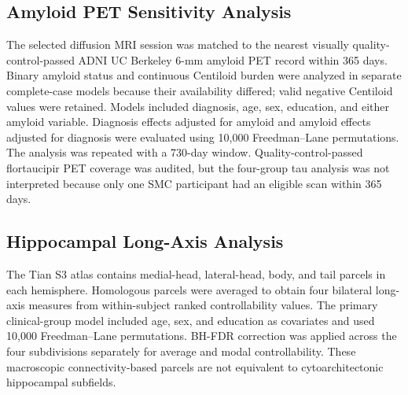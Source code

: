 \documentclass{article}
\begin{document}
\subsection{Amyloid PET Sensitivity Analysis}
The selected diffusion MRI session was matched to the nearest visually quality-control-passed ADNI UC Berkeley 6-mm amyloid PET record within 365 days. Binary amyloid status and continuous Centiloid burden were analyzed in separate complete-case models because their availability differed; valid negative Centiloid values were retained. Models included diagnosis, age, sex, education, and either amyloid variable. Diagnosis effects adjusted for amyloid and amyloid effects adjusted for diagnosis were evaluated using 10,000 Freedman--Lane permutations. The analysis was repeated with a 730-day window. Quality-control-passed flortaucipir PET coverage was audited, but the four-group tau analysis was not interpreted because only one SMC participant had an eligible scan within 365 days.

\subsection{Hippocampal Long-Axis Analysis}
The Tian S3 atlas contains medial-head, lateral-head, body, and tail parcels in each hemisphere. Homologous parcels were averaged to obtain four bilateral long-axis measures from within-subject ranked controllability values. The primary clinical-group model included age, sex, and education as
covariates and used 10,000 Freedman--Lane permutations. BH-FDR correction
was applied across the four subdivisions separately for average and
modal controllability. These macroscopic connectivity-based parcels are not equivalent to cytoarchitectonic hippocampal subfields.
\end{document}
